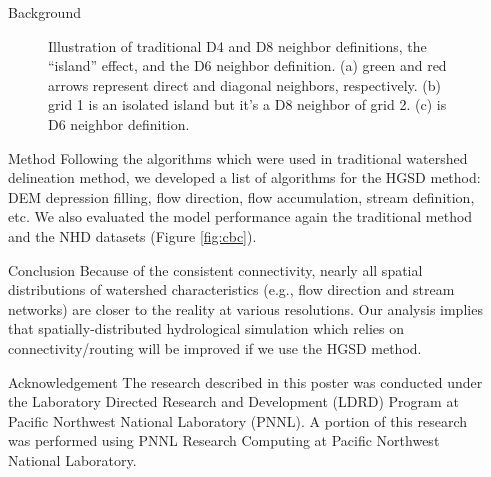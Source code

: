 \documentclass[final]{beamer}
\newlength{\sepwid}
\newlength{\onecolwid}
\newlength{\threecolwid}
\begin{document}
\begin{frame}[t]
\begin{columns}[t]
\begin{column}{\onecolwid}
\begin{block}{Background}
\begin{figure}[H]
\begin{subfigure}[t]{0.3\textwidth}
            \caption{}
            \label{fig:d6}
          \end{subfigure}
          \caption{Illustration of traditional D4 and D8 neighbor definitions, the ``island'' effect, and the D6 neighbor definition. (a) green and red arrows represent direct and diagonal neighbors, respectively. (b) grid 1 is an isolated island but it's a D8 neighbor of grid 2. (c) is D6 neighbor definition.}
          \label{fig:d4d8_island_d6}
        \end{figure}
      \end{block}
      \begin{block}{Method}
        Following the algorithms which were used in traditional watershed delineation method, we developed a list of algorithms for the HGSD method: DEM depression filling, flow direction, flow accumulation, stream definition, etc.
        We also evaluated the model performance again the traditional method and the NHD datasets (Figure \ref{fig:cbc}).
      \end{block}
      \begin{alertblock}{Conclusion}
        Because of the consistent connectivity, nearly all spatial distributions of watershed characteristics (e.g., flow direction and stream networks) are closer to the reality at various resolutions.
        Our analysis implies that spatially-distributed hydrological simulation which relies on connectivity/routing will be improved if we use the HGSD method.
      \end{alertblock}

      \begin{alertblock}{Acknowledgement}
        The research described in this poster was conducted under the Laboratory Directed Research and Development (LDRD) Program at Pacific Northwest National Laboratory (PNNL). A portion of this research was performed using PNNL Research Computing at Pacific Northwest National Laboratory.
      \end{alertblock}
    \end{column} %
    \begin{column}{\threecolwid}
      \vspace{10in}


\end{column}
\end{columns}
\end{frame}
\end{document}
